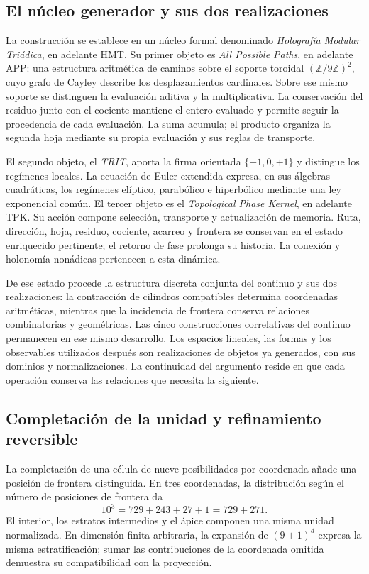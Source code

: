 \subsection*{El núcleo generador y sus dos realizaciones}
La construcción se establece en un núcleo formal denominado \emph{Holografía Modular Triádica}, en adelante HMT. Su primer objeto es \emph{All Possible Paths}, en adelante APP: una estructura aritmética de caminos sobre el soporte toroidal \((\mathbb Z/9\mathbb Z)^2\), cuyo grafo de Cayley describe los desplazamientos cardinales. Sobre ese mismo soporte se distinguen la evaluación aditiva y la multiplicativa. La conservación del residuo junto con el cociente mantiene el entero evaluado y permite seguir la procedencia de cada evaluación. La suma acumula; el producto organiza la segunda hoja mediante su propia evaluación y sus reglas de transporte.

El segundo objeto, el \emph{TRIT}, aporta la firma orientada \(\{-1,0,+1\}\) y distingue los regímenes locales. La ecuación de Euler extendida expresa, en sus álgebras cuadráticas, los regímenes elíptico, parabólico e hiperbólico mediante una ley exponencial común. El tercer objeto es el \emph{Topological Phase Kernel}, en adelante TPK. Su acción compone selección, transporte y actualización de memoria. Ruta, dirección, hoja, residuo, cociente, acarreo y frontera se conservan en el estado enriquecido pertinente; el retorno de fase prolonga su historia. La conexión y holonomía nonádicas pertenecen a esta dinámica.

De ese estado procede la estructura discreta conjunta del continuo y sus dos realizaciones: la contracción de cilindros compatibles determina coordenadas aritméticas, mientras que la incidencia de frontera conserva relaciones combinatorias y geométricas. Las cinco construcciones correlativas del continuo permanecen en ese mismo desarrollo. Los espacios lineales, las formas y los observables utilizados después son realizaciones de objetos ya generados, con sus dominios y normalizaciones. La continuidad del argumento reside en que cada operación conserva las relaciones que necesita la siguiente.

\subsection*{Completación de la unidad y refinamiento reversible}
La completación de una célula de nueve posibilidades por coordenada añade una posición de frontera distinguida. En tres coordenadas, la distribución según el número de posiciones de frontera da
\[
10^3=729+243+27+1=729+271.
\]
El interior, los estratos intermedios y el ápice componen una misma unidad normalizada. En dimensión finita arbitraria, la expansión de \((9+1)^d\) expresa la misma estratificación; sumar las contribuciones de la coordenada omitida demuestra su compatibilidad con la proyección.

